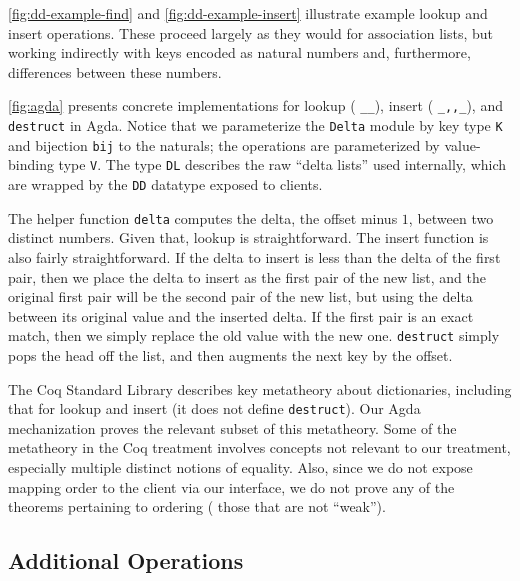 

\autoref{fig:dd-example-find} and \autoref{fig:dd-example-insert} illustrate example lookup and insert operations.
%
These proceed largely as they would for association lists, but working indirectly with keys encoded as natural numbers and, furthermore, differences between these numbers.

\autoref{fig:agda} presents concrete implementations for lookup (\ie{} \texttt{\_\altLAng\_\altRAng}), insert (\ie{} \texttt{\_,,\_}), and \texttt{destruct} in Agda.
%
Notice that we parameterize the \texttt{Delta} module by key type \verb+K+ and bijection \verb+bij+ to the naturals; the operations are parameterized by value-binding type \verb+V+.
%
%
The type \verb+DL+ describes the raw ``delta lists'' used internally, which are wrapped by the \verb+DD+ datatype exposed to clients.

The helper function \verb+delta+ computes the delta, \ie{} the offset minus $1$, between two distinct numbers.
%
Given that, lookup is straightforward. The insert function is also fairly straightforward.
%
If the delta to insert is less than the delta of the first pair, then we place the delta to insert as the first pair of the new list, and
%
the original first pair will be the second pair of the new list, but using the delta between its original value and the inserted delta.
%
If the first pair is an exact match, then we simply replace the old value with the new one.
%
\verb+destruct+ simply pops the head off the list, and then augments the next key by the offset.

%
The Coq Standard Library \citep{FMapInterface} \citep{FMapFacts} describes key metatheory about dictionaries, including that for lookup and insert (it does not define \verb+destruct+).
%
Our Agda mechanization proves the relevant subset of this metatheory. Some of the metatheory in the Coq treatment involves concepts not relevant to our treatment,
%
especially multiple distinct notions of equality. Also, since we do not expose mapping order to the client via our interface,
%
we do not prove any of the theorems pertaining to ordering (\ie{} those that are not ``weak'').


\subsection{Additional Operations}

